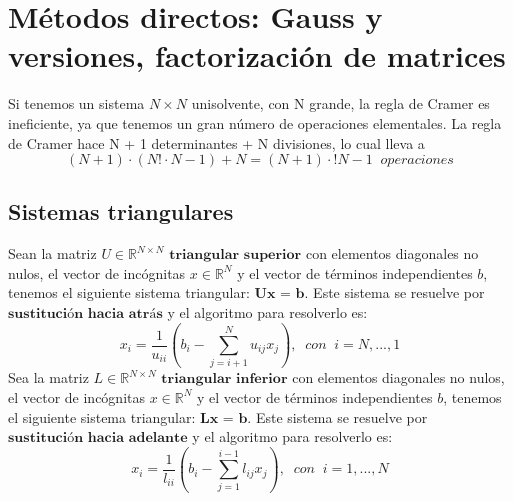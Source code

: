 \section{Métodos directos: Gauss y versiones, factorización de matrices}
Si tenemos un sistema $N \times N$ unisolvente, con N grande, la regla de Cramer es ineficiente, ya que tenemos un gran número de operaciones elementales. La regla de Cramer hace N + 1 determinantes + N divisiones, lo cual lleva a
\[ (N+1)\cdot (N!\cdot N-1)+N = (N+1)\cdot !N-1 \; \; operaciones \]

\subsection{Sistemas triangulares}
Sean la matriz $U \in \mathbb{R}^{N \times N}$ $\textbf{triangular superior}$ con elementos diagonales no nulos, el vector de incógnitas $x \in \mathbb{R}^N$ y el vector de términos independientes $b$, tenemos el siguiente sistema triangular: $\textbf{Ux = b}$. Este sistema se resuelve por $\textbf{sustitución hacia atrás}$ y el algoritmo para resolverlo es:
\[ x_i = \frac{1}{u_{ii}} \left( b_i - \sum _{j=i+1}^N u_{ij}x_j \right), \; \; con \; \; i = N,...,1 \]
Sea la matriz $L \in \mathbb{R}^{N \times N}$  $\textbf{triangular inferior}$ con elementos diagonales no nulos, el vector de incógnitas $x \in \mathbb{R}^N$ y el vector de términos independientes $b$, tenemos el siguiente sistema triangular: $\textbf{Lx = b}$. Este sistema se resuelve por $\textbf{sustitución hacia adelante}$ y el algoritmo para resolverlo es:
\[ x_i = \frac{1}{l_{ii}} \left( b_i - \sum _{j=1}^{i-1} l_{ij}x_j \right), \; \; con \; \; i = 1,...,N \]
		
